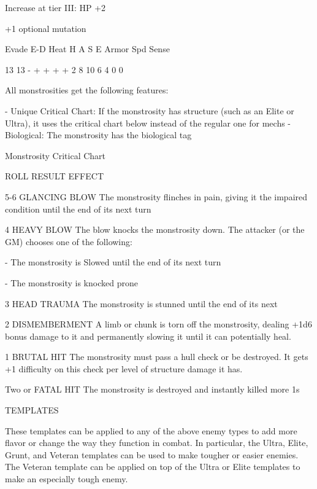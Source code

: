 Increase at tier III:
HP +2

+1 optional mutation


         Evade    E-D     Heat    H   A   S    E   Armor     Spd       Sense

         13       13      -       +   +   +    +   2         8         10
                                  6   4   0    0

All monstrosities get the following features:

    -    Unique Critical Chart: If the monstrosity has structure (such as an Elite or Ultra), it uses
         the critical chart below instead of the regular one for mechs
    -    Biological: The monstrosity has the biological tag

                                          Monstrosity Critical Chart

 ROLL       RESULT                   EFFECT

 5-6         GLANCING BLOW           The monstrosity flinches in pain, giving it the impaired condition until
                                     the end of its next turn

 4           HEAVY BLOW              The blow knocks the monstrosity down. The attacker (or the GM)
                                     chooses one of the following:

                                         -   The monstrosity is Slowed until the end of its next turn

                                         -   The monstrosity is knocked prone

 3           HEAD TRAUMA             The monstrosity is stunned until the end of its next

 2           DISMEMBERMENT           A limb or chunk is torn off the monstrosity, dealing +1d6 bonus damage
                                     to it and permanently slowing it until it can potentially heal.

 1           BRUTAL HIT              The monstrosity must pass a hull check or be destroyed. It gets +1
                                     difficulty on this check per level of structure damage it has.




Two or     FATAL HIT              The monstrosity is destroyed and instantly killed
more
1s




                                       TEMPLATES


These templates can be applied to any of the above enemy types to add more flavor or change
the way they function in combat. In particular, the Ultra, Elite, Grunt, and Veteran templates can
be used to make tougher or easier enemies. The Veteran template can be applied on top of the
Ultra or Elite templates to make an especially tough enemy.
